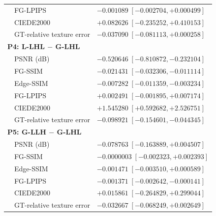 \begin{longtable}{p{4.0cm}p{3.1cm}p{7.2cm}}
& FG-LPIPS & $-0.001089\;[-0.002704,+0.000499]$ \\
& CIEDE2000 & $+0.082626\;[-0.235252,+0.410153]$ \\
& GT-relative texture error & $-0.037090\;[-0.081113,+0.000258]$ \\
\multicolumn{3}{l}{\textbf{P4: L-LHL $-$ G-LHL}}\\
& PSNR (dB) & $-0.520646\;[-0.810872,-0.232104]$ \\
& FG-SSIM & $-0.021431\;[-0.032306,-0.011114]$ \\
& Edge-SSIM & $-0.007282\;[-0.011359,-0.003234]$ \\
& FG-LPIPS & $+0.002491\;[-0.001895,+0.007174]$ \\
& CIEDE2000 & $+1.545280\;[+0.592682,+2.526751]$ \\
& GT-relative texture error & $-0.098921\;[-0.154601,-0.044345]$ \\
\multicolumn{3}{l}{\textbf{P5: G-LLH $-$ G-LHL}}\\
& PSNR (dB) & $-0.078763\;[-0.163889,+0.004507]$ \\
& FG-SSIM & $-0.0000003\;[-0.002323,+0.002393]$ \\
& Edge-SSIM & $-0.001471\;[-0.003510,+0.000589]$ \\
& FG-LPIPS & $-0.001371\;[-0.002642,-0.000141]$ \\
& CIEDE2000 & $+0.015861\;[-0.264829,+0.299044]$ \\
& GT-relative texture error & $-0.032667\;[-0.068249,+0.002649]$ \\
\bottomrule
\end{longtable}
\endgroup
